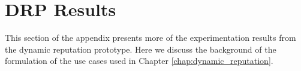\chapter{DRP Results}
\label{chap:appendix_drp_results}

This section of the appendix presents more of the experimentation results from the dynamic reputation prototype. Here we discuss the background of the formulation of the use cases used in Chapter \ref{chap:dynamic_reputation}.

% 
